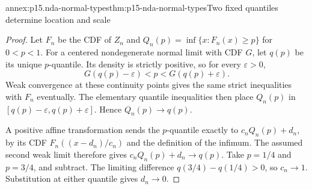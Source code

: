 \begin{annexitem}{annex:p15.nda-normal-types}{thm:p15-nda-normal-types}{Two fixed quantiles determine location and scale}
\begin{proof}
Let \(F_n\) be the CDF of \(Z_n\) and
\(Q_n(p)=\inf\{x:F_n(x)\geq p\}\) for \(0<p<1\).
For a centered nondegenerate normal limit with CDF \(G\),
let \(q(p)\) be its unique \(p\)-quantile.
Its density is strictly positive, so for every \(\varepsilon>0\),
\[
 G(q(p)-\varepsilon)<p<G(q(p)+\varepsilon).
 \]
Weak convergence at these continuity points gives the same strict
inequalities with \(F_n\) eventually. The elementary quantile
inequalities then place \(Q_n(p)\) in
\([q(p)-\varepsilon,q(p)+\varepsilon]\).
Hence \(Q_n(p)\to q(p)\).

A positive affine transformation sends the \(p\)-quantile exactly
to \(c_nQ_n(p)+d_n\), by its CDF
\(F_n((x-d_n)/c_n)\) and the definition of the infimum.
The assumed second weak limit therefore gives
\(c_nQ_n(p)+d_n\to q(p)\).
Take \(p=1/4\) and \(p=3/4\), and subtract.
The limiting difference \(q(3/4)-q(1/4)>0\), so \(c_n\to1\).
Substitution at either quantile gives \(d_n\to0\).
\end{proof}
\end{annexitem}

